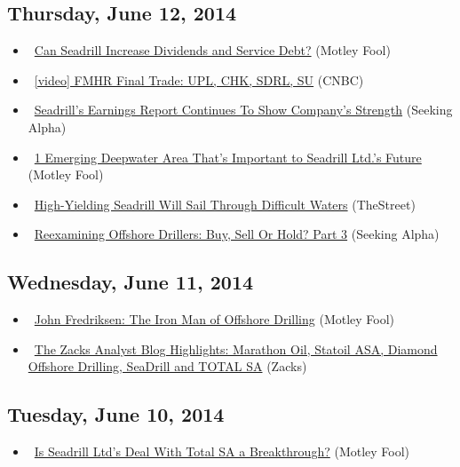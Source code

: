 \documentclass[11pt,asymmetric]{article}
\begin{document}
\subsection*{Thursday, June 12, 2014}
\begin{itemize}
\item\ \href{http://www.fool.com/investing/general/2014/06/11/can-seadrill-increase-dividends-and-service-debt.aspx?source=eogyholnk0000001}{Can Seadrill Increase Dividends and Service Debt?} (Motley Fool)
\item\ \href{http://video.cnbc.com/gallery/?video=3000283595&__source=yahoo%7cheadline%7cquote%7cvideo%7c&par=yahoo}{[video] FMHR Final Trade: UPL, CHK, SDRL, SU} (CNBC)
\item\ \href{http://seekingalpha.com/article/2265693-seadrills-earnings-report-continues-to-show-companys-strength?source=yahoo}{Seadrill's Earnings Report Continues To Show Company's Strength} (Seeking Alpha)
\item\ \href{http://www.fool.com/investing/general/2014/06/12/1-emerging-deepwater-area-thats-important-to-seadr.aspx?source=eogyholnk0000001}{1 Emerging Deepwater Area That’s Important to Seadrill Ltd.’s Future} (Motley Fool)
\item\ \href{http://www.thestreet.com/story/12741610/1/high-yielding-seadrill-will-sail-through-difficult-waters.html?puc=yahoo&cm_ven=YAHOO}{High-Yielding Seadrill Will Sail Through Difficult Waters} (TheStreet)
\item\ \href{http://seekingalpha.com/article/2265213-reexamining-offshore-drillers-buy-sell-or-hold-part-3?source=yahoo}{Reexamining Offshore Drillers: Buy, Sell Or Hold? Part 3} (Seeking Alpha)
\end{itemize}
\subsection*{Wednesday, June 11, 2014}
\begin{itemize}
\item\ \href{http://www.fool.com/investing/general/2014/06/11/john-fredriksen-the-iron-man-of-offshore-drilling.aspx?source=eogyholnk0000001}{John Fredriksen: The Iron Man of Offshore Drilling} (Motley Fool)
\item\ \href{http://finance.yahoo.com/news/zacks-analyst-blog-highlights-marathon-124341185.html}{The Zacks Analyst Blog Highlights: Marathon Oil, Statoil ASA, Diamond Offshore Drilling, SeaDrill and TOTAL SA} (Zacks)
\end{itemize}
\subsection*{Tuesday, June 10, 2014}
\begin{itemize}
\item\ \href{http://www.fool.com/investing/general/2014/06/10/is-seadrill-ltds-deal-with-total-sa-adr-a-breakthr.aspx?source=eogyholnk0000001}{Is Seadrill Ltd's Deal With Total SA a Breakthrough?} (Motley Fool)
\end{itemize}
\end{document}
